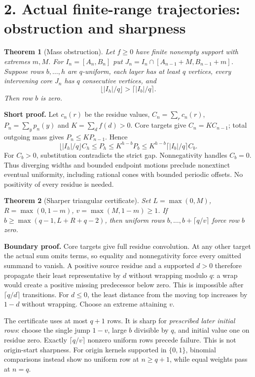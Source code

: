 \documentclass[10pt]{article}
\newtheorem{theorem}{Theorem}
\begin{document}
\section*{2. Actual finite-range trajectories: obstruction and sharpness}
\begin{theorem}[Mass obstruction]
Let $f\ge0$ have finite nonempty support with extremes $m,M$. For $I_n=[A_n,B_n]$ put $J_n=I_n\cap[A_{n-1}+M,B_{n-1}+m]$. Suppose rows $b,\ldots,h$ are $q$-uniform, each layer has at least $q$ vertices, every intervening core $J_n$ has $q$ consecutive vertices, and
\[
\lfloor|I_h|/q\rfloor>\lceil|I_b|/q\rceil.
\]
Then row $b$ is zero.
\end{theorem}
\textbf{Short proof.} Let $c_n(r)$ be the residue values, $C_n=\sum_r c_n(r)$, $P_n=\sum_y p_n(y)$ and $K=\sum_d f(d)>0$. Core targets give $C_n=KC_{n-1}$; total outgoing mass gives $P_n\le KP_{n-1}$. Hence
\[
\lfloor|I_h|/q\rfloor C_h\le P_h\le K^{h-b}P_b
\le K^{h-b}\lceil|I_b|/q\rceil C_b.
\]
For $C_b>0$, substitution contradicts the strict gap. Nonnegativity handles $C_b=0$. Thus diverging widths and bounded endpoint motions preclude nonextinct eventual uniformity, including rational cones with bounded periodic offsets. No positivity of every residue is needed.

\begin{theorem}[Sharper triangular certificate]
Set $L=\max(0,M)$, $R=\max(0,1-m)$, $v=\max(M,1-m)\ge1$. If $b\ge\max(q-1,L+R+q-2)$, then uniform rows $b,\ldots,b+\lceil q/v\rceil$ force row $b$ zero.
\end{theorem}
\textbf{Boundary proof.} Core targets give full residue convolution. At any other target the actual sum omits terms, so equality and nonnegativity force every omitted summand to vanish. A positive source residue and a supported $d>0$ therefore propagate their least representative by $d$ without wrapping modulo $q$: a wrap would create a positive missing predecessor below zero. This is impossible after $\lceil q/d\rceil$ transitions. For $d\le0$, the least distance from the moving top increases by $1-d$ without wrapping. Choose an extreme attaining $v$.

The certificate uses at most $q+1$ rows. It is sharp for \emph{prescribed later initial rows}: choose the single jump $1-v$, large $b$ divisible by $q$, and initial value one on residue zero. Exactly $\lceil q/v\rceil$ nonzero uniform rows precede failure. This is not origin-start sharpness. For origin kernels supported in $\{0,1\}$, binomial comparisons instead show no uniform row at $n\ge q+1$, while equal weights pass at $n=q$.
\end{document}

